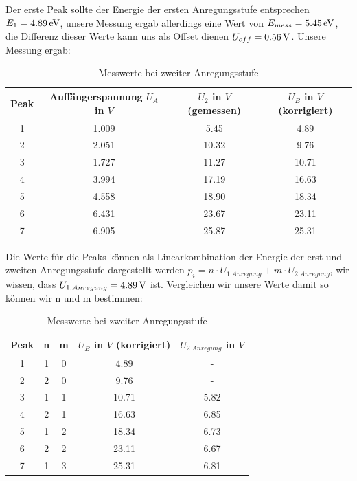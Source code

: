 \documentclass[a4paper,titlepage]{scrartcl}
\numberwithin{equation}{section}
\begin{document}
Der erste Peak sollte der Energie der ersten Anregungsstufe entsprechen $E_1= \unit[4.89]{eV}$, unsere Messung ergab allerdings eine Wert von $E_{mess}=\unit[5.45]{eV}$, die Differenz dieser Werte kann uns als Offset dienen $U_{off}= \unit[0.56]{V}$. Unsere Messung ergab:

\begin{table}[H]
\centering
\caption{Messwerte bei zweiter Anregungsstufe}
	\begin{tabular}{c|c|c|c}
  Peak & Auffängerspannung $U_A$ in $V$ & $U_2$ in $V$ (gemessen) & $U_B$ in $V$ (korrigiert)\\
		\hline
		1 & 1.009 & 5.45 & 4.89\\
        2 & 2.051 & 10.32 & 9.76\\
        3 & 1.727 & 11.27 & 10.71\\
        4 & 3.994 & 17.19 & 16.63\\
        5 & 4.558 & 18.90 & 18.34\\
        6 & 6.431 & 23.67 & 23.11\\
        7 & 6.905 & 25.87 & 25.31\\
	\end{tabular}
\end{table}

Die Werte für die Peaks können als Linearkombination der Energie der erst und zweiten Anregungsstufe dargestellt werden $p_i= n \cdot U_{1.Anregung} + m \cdot U_{2.Anregung}$, wir wissen, dass $U_{1.Anregung}= \unit[4.89]{V}$ ist. Vergleichen wir unsere Werte damit so können wir n und m bestimmen:

\begin{table}[H]
\centering
\caption{Messwerte bei zweiter Anregungsstufe}
	\begin{tabular}{c|c|c|c|c}
  Peak & n & m & $U_B$ in $V$ (korrigiert) & $ U_{2.Anregung}$ in $V$\\
		\hline
		1 & 1 & 0 & 4.89 & - \\
        2 & 2 & 0 & 9.76 & - \\
        3 & 1 & 1 & 10.71 & 5.82 \\
        4 & 2 & 1 & 16.63 & 6.85 \\
        5 & 1 & 2 & 18.34 & 6.73 \\
        6 & 2 & 2 & 23.11 & 6.67 \\
        7 & 1 & 3 & 25.31 & 6.81 \\
	\end{tabular}
\end{table}
\end{document}
